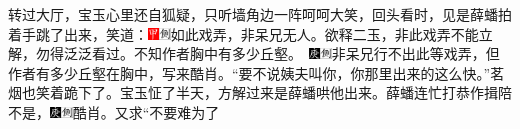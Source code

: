 转过大厅，宝玉心里还自狐疑，只听墙角边一阵呵呵大笑，回头看时，见是薛蟠拍着手跳了出来，笑道：{\includegraphics[width=3mm]{../Images/00002}\includegraphics[width=3mm]{../Images/00011}\footnotesize \kaishu 如此戏弄，非呆兄无人。欲释二玉，非此戏弄不能立解，勿得泛泛看过。不知作者胸中有多少丘壑。　\includegraphics[width=3mm]{../Images/00004}\includegraphics[width=3mm]{../Images/00011}\footnotesize \kaishu 非呆兄行不出此等戏弄，但作者有多少丘壑在胸中，写来酷肖。}“要不说姨夫叫你，你那里出来的这么快。”茗烟也笑着跪下了。宝玉怔了半天，方解过来是薛蟠哄他出来。薛蟠连忙打恭作揖陪不是，{\includegraphics[width=3mm]{../Images/00004}\includegraphics[width=3mm]{../Images/00011}\footnotesize \kaishu 酷肖。}又求“不要难为了